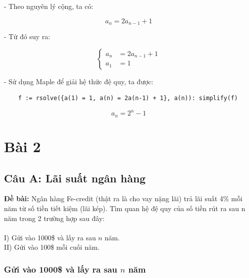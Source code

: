 \documentclass[12pt]{article}
\begin{document}
\begin{sloppypar}
- Theo nguyên lý cộng, ta có:

\begin{equation*}
    a_{n} = 2a_{n-1} + 1
\end{equation*}

- Từ đó suy ra:

\[
    \begin{cases}
        a_{n} & = 2a_{n - 1} + 1 \\             
        a_{1} & = 1 
    \end{cases}
    \]



- Sử dụng Maple để giải hệ thức đệ quy, ta được:

\begin{verbatim}
    f := rsolve({a(1) = 1, a(n) = 2a(n-1) + 1}, a(n)): simplify(f)
\end{verbatim}

\begin{equation*}
    a_{n} = 2^{n} - 1
\end{equation*}

\section{Bài 2}

\subsection{Câu A: Lãi suất ngân hàng}
\begin{tcolorbox}
    \textbf{Đề bài:} Ngân hàng Fe-credit (thật ra là cho vay nặng lãi) trả lãi suất 4\% mỗi năm từ số tiền tiết kiệm (lãi kép). Tìm quan hệ đệ quy của số tiền rút ra sau n năm trong 2 trường hợp sau đây: \\ \\
    I)  Gửi vào 1000\$ và lấy ra sau \(n\) năm. \\
    II) Gửi vào 100\$ mỗi cuối năm.
\end{tcolorbox}

\subsubsection{Gửi vào 1000\$ và lấy ra sau \(n\) năm}


\end{sloppypar}
\end{document}
